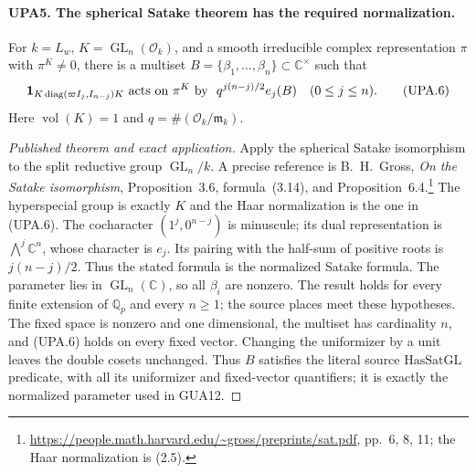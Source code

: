 \documentclass[11pt,a4paper]{article}
\numberwithin{equation}{section}
\theoremstyle{remark}\newtheorem{remark}[theorem]{Remark}
\begin{document}
\paragraph{UPA5. The spherical Satake theorem has the required normalization.}
\label{claim:UPA5}
For $k=L_w$, $K=\operatorname{GL}_n(\mathcal O_k)$,
and a smooth irreducible complex representation $\pi$ with
$\pi^K\ne0$, there is a multiset
$B=\{\beta_1,\ldots,\beta_n\}\subset\mathbb C^\times$
such that
\[
 {\bf1}_{K\operatorname{diag}(\varpi I_j,I_{n-j})K}
       \ \text{acts on }\pi^K\text{ by }\
 q^{j(n-j)/2}e_j(B)\quad(0\leq j\leq n).
 \tag{UPA.6}
\]
Here $\operatorname{vol}(K)=1$ and $q=\#(\mathcal O_k/\mathfrak m_k)$.
\begin{proof}[Published theorem and exact application]
Apply the spherical Satake isomorphism to the split reductive group
$\operatorname{GL}_n/k$.  A precise reference is B.~H.~Gross,
\emph{On the Satake isomorphism}, Proposition~3.6,
formula~(3.14), and Proposition~6.4.\footnote{
\url{https://people.math.harvard.edu/~gross/preprints/sat.pdf},
pp.~6, 8, 11; the Haar normalization is (2.5).}
The hyperspecial group is exactly $K$ and the Haar normalization
is the one in (UPA.6).  The cocharacter $(1^j,0^{n-j})$
is minuscule; its dual representation is $\bigwedge^j\mathbb C^n$,
whose character is $e_j$.  Its pairing with the half-sum of
positive roots is $j(n-j)/2$.  Thus the stated formula is
the normalized Satake formula.  The parameter lies in
$\operatorname{GL}_n(\mathbb C)$, so all $\beta_i$ are nonzero.
The result holds for every finite extension of $\mathbb Q_p$
and every $n\geq1$; the source places meet these hypotheses.
The fixed space is nonzero and one dimensional, the multiset has
cardinality $n$, and (UPA.6) holds on every fixed vector.
Changing the uniformizer by a unit leaves the double cosets unchanged.
Thus $B$ satisfies the literal source $\mathrm{HasSatGL}$ predicate,
with all its uniformizer and fixed-vector quantifiers; it is exactly
the normalized parameter used in GUA12.
\end{proof}

\end{document}
